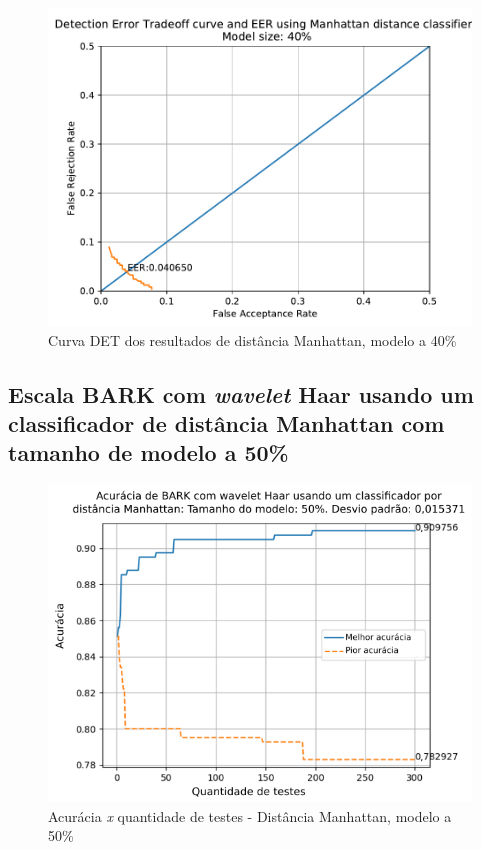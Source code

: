 			\begin{figure}[!h]
				\centering
				\includegraphics[width=.6\linewidth]{images/results/det/DET_for_classifier_Manhattan_40}
				\caption{Curva DET dos resultados de distância Manhattan, modelo a 40\%}
				\label{fig:detforclassifiermanhattan40}
			\end{figure}
		
			\FloatBarrier
		\subsection{Escala BARK com \textit{wavelet} Haar usando um classificador de distância Manhattan com tamanho de modelo a 50\%}
		
			
			
			\begin{figure}[ht]
				\centering
				\includegraphics[width=.6\linewidth]{images/results/confusionMatrices/classifier_Manhattan_50.png}
				\caption{Acurácia \textit{x} quantidade de testes - Distância Manhattan, modelo a 50\%}
				\label{fig:classifiermanhattan50}
			\end{figure}
	
